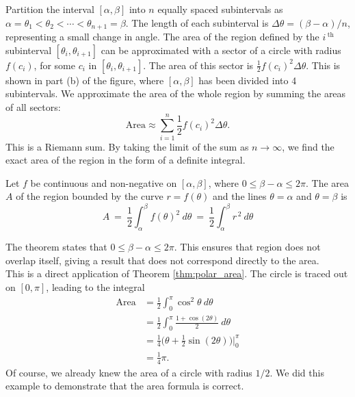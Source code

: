 Partition the interval $[\alpha,\beta]$ into $n$ equally spaced subintervals as $\alpha = \theta_1 < \theta_2 <\cdots <\theta_{n+1}=\beta$. The length of each subinterval is $\Delta\theta = (\beta-\alpha)/n$, representing a small change in angle. The area of the region defined by the $i\,^\text{th}$ subinterval $[\theta_i,\theta_{i+1}]$ can be approximated with a sector of a circle with radius $f(c_i)$, for some $c_i$ in $[\theta_i,\theta_{i+1}]$. The area of this sector is $\frac12f(c_i)^2\Delta\theta$. This is shown in part (b) of the figure, where $[\alpha,\beta]$ has been divided into 4 subintervals. We approximate the area of the whole region by summing the areas of all sectors:
$$\text{Area} \approx \sum_{i=1}^n \frac12f(c_i)^2\Delta\theta.$$
This is a Riemann sum. By taking the limit of the sum as $n\to\infty$, we find the exact area of the region in the form of a definite integral.
\enlargethispage{2\baselineskip}

{Let $f$ be continuous and non-negative on $[\alpha,\beta]$, where $0\leq \beta-\alpha\leq 2\pi$. The area  $A$ of the region bounded by the curve $r=f(\theta)$ and the lines $\theta=\alpha$ and $\theta=\beta$ is 
$$
A \ =\  \frac12\int_\alpha^\beta f(\theta)^2 \ d\theta\  =\  \frac12\int_\alpha^\beta r^{\,2} \ d\theta$$
}

The theorem states that $0\leq \beta-\alpha\leq 2\pi$. This ensures that region does not overlap itself, giving a result that does not correspond directly to the area.\\

{This is a direct application of Theorem \ref{thm:polar_area}. The circle is traced out on $[0,\pi]$, leading to the integral
\begin{align*}
\text{Area} &= \frac12\int_0^\pi \cos^2\theta\ d  \theta \\
						&= \frac12\int_0^\pi \frac{1+\cos(2\theta)}{2}\ d\theta\\
						&= \frac14\big(\theta +\frac12\sin(2\theta)\big)\Bigg|_0^\pi\\
						&= \frac14\pi.
\end{align*}
Of course, we already knew the area of a circle with radius $1/2$. We did this example to demonstrate that the area formula is correct.
}\\

